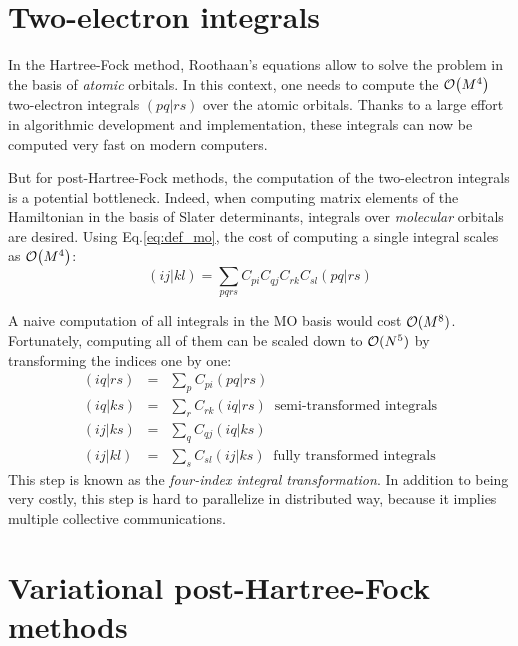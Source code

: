 \documentclass[./thesis.tex]{subfiles}
\begin{document}
\section{Two-electron integrals}

In the Hartree-Fock method, Roothaan's equations allow to solve the problem in the basis of 
\emph{atomic} orbitals.\cite{Roothaan_1951}
In this context, one needs to compute the $\order{M^4}$ two-electron integrals $(pq|rs)$ over the
atomic orbitals. Thanks to a large effort in algorithmic development and
implementation,\cite{Obara_1986,Head_Gordon_1988,Ten_no_1993,Gill_1989,Gill_1991,Libint2,Zhang_2018}
these integrals can now be computed very fast on modern computers.

But for post-Hartree-Fock methods, the computation of the two-electron
integrals is a potential bottleneck.
Indeed, when computing matrix elements of the Hamiltonian in the basis of
Slater determinants, integrals over \emph{molecular} orbitals are desired. Using
Eq.\eqref{eq:def_mo},
the cost of computing a single integral scales as $\order{M^4}$:
\begin{equation}
(ij|kl) = \sum_{pqrs} C_{pi} C_{qj} C_{rk} C_{sl} (pq|rs)
\end{equation}

A naive computation of all integrals in the MO basis would cost ${\cal O}(M^8)$. Fortunately, computing all of them can be scaled down to ${\cal O}(N^5)$ by transforming the indices one by one\cite{Wilson_1987}:
\begin{eqnarray}
(iq\vert rs) & = & \sum_{p} C_{pi} (pq|rs) \nonumber \\ 
(iq\vert ks) & = & \sum_{r} C_{rk} (iq|rs) \;\; \text{semi-transformed integrals} \\
(ij\vert ks) & = & \sum_{q} C_{qj} (iq|ks) \nonumber \\ 
(ij\vert kl) & = & \sum_{s} C_{sl} (ij|ks)  \;\; \text{fully transformed integrals}
\end{eqnarray}
This step is known as the \emph{four-index integral transformation}.  
In addition to being very costly, this step is hard to parallelize in
distributed way, because it implies multiple collective communications.\cite{Rajbhandari_2017,Limaye_1994,Fletcher_1999,Covick_1990}



\section{Variational post-Hartree-Fock methods}
\end{document}
